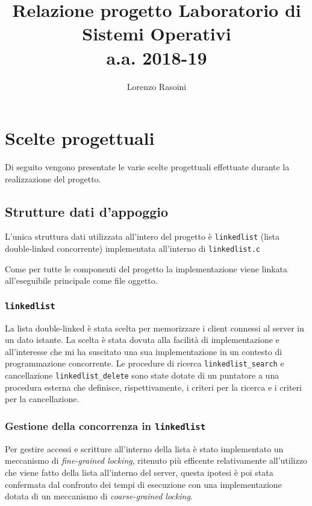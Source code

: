 \documentclass[a4paper,11pt]{article}
\begin{document}
\begin{titlepage}

\title{{Relazione progetto Laboratorio di\\Sistemi Operativi\\a.a. 2018-19}}
\author{Lorenzo Rasoini}
\date{}
\maketitle

\thispagestyle{empty}
\tableofcontents
\end{titlepage}

\newpage

\section{Scelte progettuali}
Di seguito vengono presentate le varie scelte progettuali effettuate durante la realizzazione del progetto.
\subsection{Strutture dati d'appoggio}
L'unica struttura dati utilizzata all'intero del progetto è \texttt{linkedlist} (lista double-linked concorrente) implementata all'interno
di \texttt{linkedlist.c}

Come per tutte le componenti del progetto la implementazione viene linkata all'eseguibile principale come file oggetto.
\subsubsection{\texttt{linkedlist}}
La lista double-linked è stata scelta per memorizzare i client connessi al server in un dato istante.
La scelta è stata dovuta alla facilità di implementazione e all'interesse che mi ha suscitato una sua implementazione in un contesto di programmazione concorrente.
Le procedure di ricerca \texttt{linkedlist\_search} e cancellazione \texttt{linkedlist\_delete} sono state dotate di un puntatore
a una procedura esterna che definisce, rispettivamente, i criteri per la ricerca e i criteri per la cancellazione.


\subsubsection{Gestione della concorrenza in \texttt{linkedlist}}
Per gestire accessi e scritture all'interno della lista è stato implementato un meccanismo di \emph{fine-grained locking}, ritenuto più efficente relativamente
all'utilizzo che viene fatto della lista all'interno del server, questa ipotesi è poi stata confermata dal confronto dei tempi di esecuzione con una implementazione dotata di un meccanismo di \emph{coarse-grained locking}.
\end{document}

